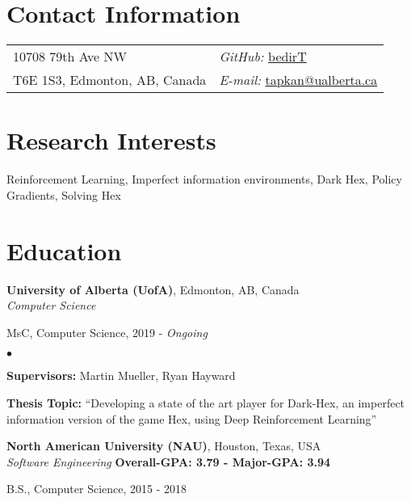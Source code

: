 \documentclass[margin,line]{res}
\newenvironment{list1}{
  \begin{list}{\ding{113}}{%
      \setlength{\itemsep}{0in}
      \setlength{\parsep}{0in} \setlength{\parskip}{0in}
      \setlength{\topsep}{0in} \setlength{\partopsep}{0in} 
      \setlength{\leftmargin}{0.17in}}}{\end{list}}
\newenvironment{list2}{
  \begin{list}{$\bullet$}{%
      \setlength{\itemsep}{0in}
      \setlength{\parsep}{0in} \setlength{\parskip}{0in}
      \setlength{\topsep}{0in} \setlength{\partopsep}{0in} 
      \setlength{\leftmargin}{0.2in}}}{\end{list}}
\begin{document}

\begin{resume}
\section{\sc Contact Information}
\vspace{.05in}
\begin{tabular}{@{}p{3in}p{3in}}
10708 79th Ave NW & \hfill {\it GitHub:}  \href{https://github.com/bedirT}{bedirT} \\
T6E 1S3, Edmonton, AB, Canada & \hfill {\it E-mail:}  \href{mailto:tapkan@ualberta.ca}{tapkan@ualberta.ca}\\
\end{tabular}


\section{\sc Research Interests}
Reinforcement Learning, Imperfect information environments, Dark Hex, Policy Gradients, Solving Hex

\section{\sc Education}

 {\bf University of Alberta (UofA)}, Edmonton, AB, Canada\\
 {\em Computer Science} 
 \begin{list1}
 \item[] MsC, Computer Science, 2019 - \textit{Ongoing}
\end{list1}
\begin{list2}
\vspace*{.05in}
\item {\bf Supervisors:}  Martin Mueller, Ryan Hayward
\item {\bf Thesis Topic:}  ``Developing a state of the art player for Dark-Hex, an imperfect information version of the game Hex, using Deep Reinforcement Learning''
\end{list2}

{\bf North American University (NAU)}, Houston, Texas, USA\\
{\em Software Engineering}  \hfill {\bf Overall-GPA: 3.79 - Major-GPA: 3.94}\\
\vspace{-.3cm}
\begin{list1}
\item[] B.S., Computer Science,  2015 - 2018
\end{list1}



\end{resume}
\end{document}
